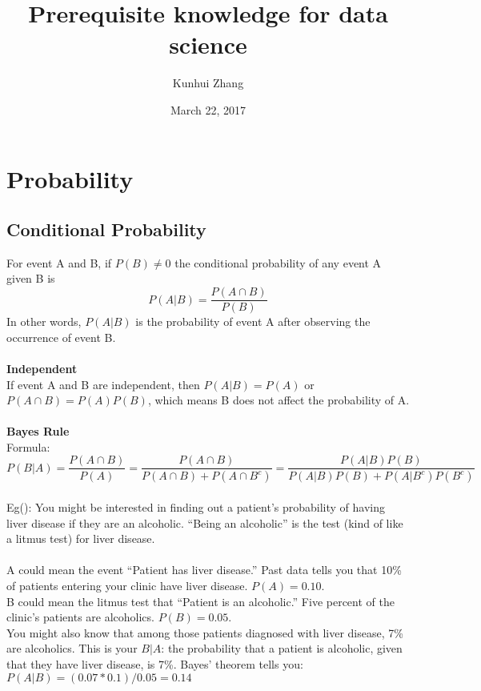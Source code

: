 \documentclass[a4paper,12pt]{article}
\let\cite\parencite
\begin{document}

% 

\title{Prerequisite knowledge for data science}
\author{Kunhui Zhang}
\date{March 22, 2017}
\maketitle
\section{Probability} 
\subsection{Conditional Probability}
For event A and B, if $P(B) \neq 0$ the conditional probability of any event A given B is
$$P(A|B) = \frac{P(A \cap B)}{P(B)}$$
In other words, $P(A|B)$ is the probability of event A after observing the occurrence of event B. \\
\\
\textbf{Independent} \\
If event A and B are independent, then $P(A|B) = P(A)$ or $P(A \cap B) = P(A)P(B)$, which means B does not affect the probability of A.\\
\\
\textbf{Bayes Rule}\\
Formula: $$P(B|A) = \frac{P(A \cap B)}{P(A)} = \frac{P(A \cap B)}{P(A \cap B) + P(A \cap B^c)} = \frac{P(A|B)P(B)}{P(A|B)P(B) + P(A|B^c)P(B^c)}$$
\\
Eg(\cite{baye}): You might be interested in finding out a patient’s probability of having liver disease if they are an alcoholic. “Being an alcoholic” is the test (kind of like a litmus test) for liver disease.\\
\\
A could mean the event “Patient has liver disease.” Past data tells you that 10\% of patients entering your clinic have liver disease. $P(A) = 0.10$. \\
B could mean the litmus test that “Patient is an alcoholic.” Five percent of the clinic’s patients are alcoholics. $P(B) = 0.05$.\\
You might also know that among those patients diagnosed with liver disease, 7\% are alcoholics. This is your $B|A$: the probability that a patient is alcoholic, given that they have liver disease, is 7\%.
Bayes’ theorem tells you:
$P(A|B) = (0.07 * 0.1)/0.05 = 0.14$
\end{document}
